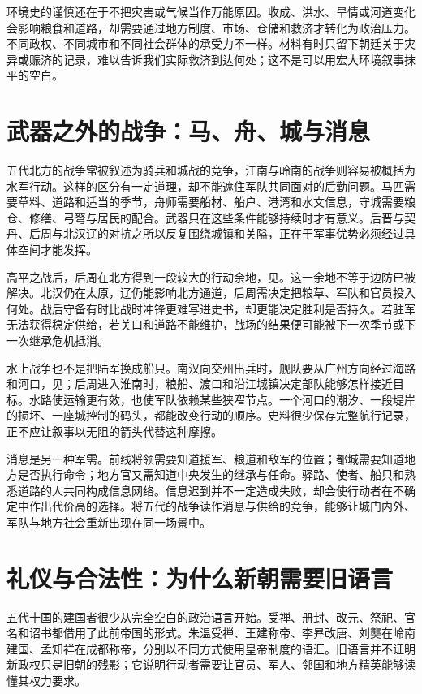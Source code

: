 环境史的谨慎还在于不把灾害或气候当作万能原因。收成、洪水、旱情或河道变化会影响粮食和道路，却需要通过地方制度、市场、仓储和救济才转化为政治压力。不同政权、不同城市和不同社会群体的承受力不一样。材料有时只留下朝廷关于灾异或赈济的记录，难以告诉我们实际救济到达何处；这不是可以用宏大环境叙事抹平的空白。

\section{武器之外的战争：马、舟、城与消息}

五代北方的战争常被叙述为骑兵和城战的竞争，江南与岭南的战争则容易被概括为水军行动。这样的区分有一定道理，却不能遮住军队共同面对的后勤问题。马匹需要草料、道路和适当的季节，舟师需要船材、船户、港湾和水文信息，守城需要粮仓、修缮、弓弩与居民的配合。武器只在这些条件能够持续时才有意义。后晋与契丹、后周与北汉辽的对抗之所以反复围绕城镇和关隘，正在于军事优势必须经过具体空间才能发挥。

高平之战后，后周在北方得到一段较大的行动余地，见。这一余地不等于边防已被解决。北汉仍在太原，辽仍能影响北方通道，后周需决定把粮草、军队和官员投入何处。战后守备有时比战时冲锋更难写进史书，却更能决定胜利是否持久。若驻军无法获得稳定供给，若关口和道路不能维护，战场的结果便可能被下一次季节或下一次继承危机抵消。

水上战争也不是把陆军换成船只。南汉向交州出兵时，舰队要从广州方向经过海路和河口，见；后周进入淮南时，粮船、渡口和沿江城镇决定部队能够怎样接近目标。水路使运输更有效，也使军队依赖某些狭窄节点。一个河口的潮汐、一段堤岸的损坏、一座城控制的码头，都能改变行动的顺序。史料很少保存完整航行记录，正不应让叙事以无阻的箭头代替这种摩擦。

消息是另一种军需。前线将领需要知道援军、粮道和敌军的位置；都城需要知道地方是否执行命令；地方官又需知道中央发生的继承与任命。驿路、使者、船只和熟悉道路的人共同构成信息网络。信息迟到并不一定造成失败，却会使行动者在不确定中作出代价高的选择。将五代的战争读作消息与供给的竞争，能够让城门内外、军队与地方社会重新出现在同一场景中。

\section{礼仪与合法性：为什么新朝需要旧语言}

五代十国的建国者很少从完全空白的政治语言开始。受禅、册封、改元、祭祀、官名和诏书都借用了此前帝国的形式。朱温受禅、王建称帝、李昪改唐、刘龑在岭南建国、孟知祥在成都称帝，分别以不同方式使用皇帝制度的语汇。旧语言并不证明新政权只是旧朝的残影；它说明行动者需要让官员、军人、邻国和地方精英能够读懂其权力要求。

